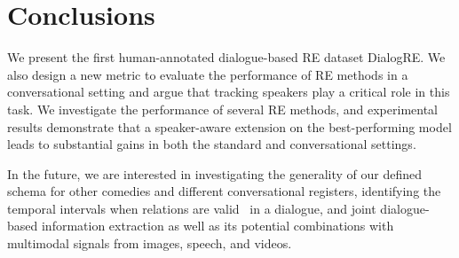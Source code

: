 \documentclass[11pt,a4paper]{article}
\begin{document}
% 

\section{Conclusions}

We present the first human-annotated dialogue-based RE dataset DialogRE. We also design a new metric to evaluate the performance of RE methods in a conversational setting and argue that tracking speakers play a critical role in this task. We investigate the performance of several RE methods, and experimental results demonstrate that a speaker-aware extension on the best-performing model leads to substantial gains in both the standard and conversational settings. 

In the future, we are interested in investigating the generality of our defined schema for other comedies and different conversational registers, identifying the temporal intervals when relations are valid~\cite{surdeanu2013overview} in a dialogue, and joint dialogue-based information extraction as well as its potential combinations with multimodal signals from images, speech, and videos.
\end{document}
